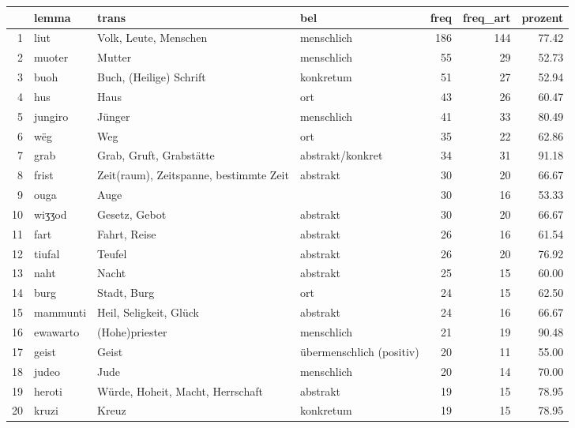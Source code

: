 \begin{tabular}{rlllrrr}
  \hline
 & lemma & trans & bel & freq & freq\_art & prozent \\ 
  \hline
1 & liut & Volk, Leute, Menschen & menschlich & 186 & 144 & 77.42 \\ 
  2 & muoter & Mutter & menschlich &  55 &  29 & 52.73 \\ 
  3 & buoh & Buch, (Heilige) Schrift & konkretum &  51 &  27 & 52.94 \\ 
  4 & hus & Haus & ort &  43 &  26 & 60.47 \\ 
  5 & jungiro & Jünger & menschlich &  41 &  33 & 80.49 \\ 
  6 & wëg & Weg & ort &  35 &  22 & 62.86 \\ 
  7 & grab & Grab, Gruft, Grabstätte & abstrakt/konkret &  34 &  31 & 91.18 \\ 
  8 & frist & Zeit(raum), Zeitspanne, bestimmte Zeit & abstrakt &  30 &  20 & 66.67 \\ 
  9 & ouga & Auge &  &  30 &  16 & 53.33 \\ 
  10 & wiʒʒod & Gesetz, Gebot & abstrakt &  30 &  20 & 66.67 \\ 
  11 & fart & Fahrt, Reise & abstrakt &  26 &  16 & 61.54 \\ 
  12 & tiufal & Teufel & abstrakt &  26 &  20 & 76.92 \\ 
  13 & naht & Nacht & abstrakt &  25 &  15 & 60.00 \\ 
  14 & burg & Stadt, Burg & ort &  24 &  15 & 62.50 \\ 
  15 & mammunti & Heil, Seligkeit, Glück & abstrakt &  24 &  16 & 66.67 \\ 
  16 & ewawarto & (Hohe)priester & menschlich &  21 &  19 & 90.48 \\ 
  17 & geist & Geist & übermenschlich (positiv) &  20 &  11 & 55.00 \\ 
  18 & judeo & Jude & menschlich &  20 &  14 & 70.00 \\ 
  19 & heroti & Würde, Hoheit, Macht, Herrschaft & abstrakt &  19 &  15 & 78.95 \\ 
  20 & kruzi & Kreuz & konkretum &  19 &  15 & 78.95 \\ 
   \hline
\end{tabular}
